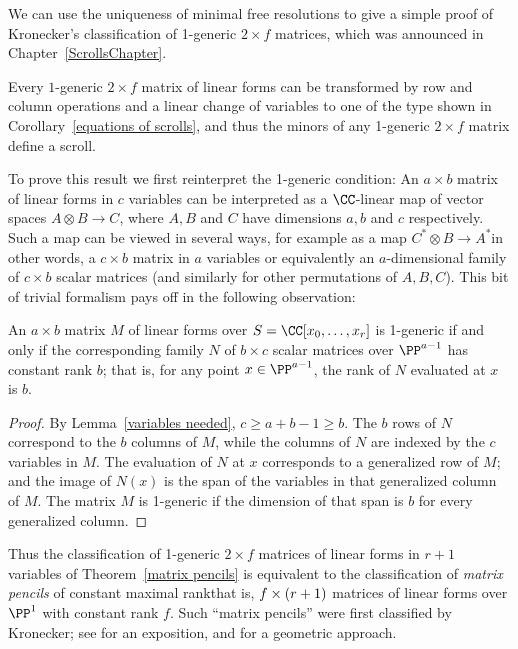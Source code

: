 We can use the uniqueness of minimal free resolutions to give a simple
proof of Kronecker's classification of 1-generic $2\times f$
%
matrices, which was announced in Chapter~\ref{ScrollsChapter}.

\begin{theorem}\label{matrix pencils}
Every
$1$-generic $2 \times f$ matrix of linear forms can be transformed by
row and column operations and a linear change
of variables to one of the type shown in
Corollary~\ref{equations of scrolls}, and thus the minors of any 1-generic
$2 \times f$ matrix define a scroll.
\unif
\end{theorem}

To prove this result we first reinterpret the 1-generic condition:
An
$a\times b$ matrix of linear forms in $c$ variables can be interpreted as a
$\CC$-linear map of vector spaces
$A \otimes B \to C$, where $A, B$ and $C$ have dimensions $a,b$ and $c$
respectively. Such a map
can be viewed in several ways, for example as a map $C^{*} \otimes B\to
A^{*}$\emdash in other words, a $c\times b$ matrix in $a$ variables\emdash
or equivalently an $a$-dimensional family of $c\times b$ scalar matrices (and
similarly for other permutations of $A,B,C$).
This bit of trivial formalism pays off in the following observation:

\begin{proposition}\label{reinterpretation of 1-generic}
An  $a\times b$ matrix $M$ of linear forms  over $S = \CC[x_{0},\dots, x_{r}]$
is 1-generic if and only if
the corresponding family $N$ of $b\times c$ scalar matrices over $\PP^{a-1}$
 has constant rank $b$; that is,
for any point $x \in \PP^{a-1}$, the rank of $N$ evaluated at $x$ is $b$.
\unif
\end{proposition}

\begin{proof}
By Lemma~\ref{variables needed},  $c \geq a+b-1 \geq b$.
 The $b$ rows of $N$ correspond to the $b$ columns of $M$, while the
columns of $N$ are indexed
by the $c$ variables in $M$. The
evaluation of $N$ at $x$ corresponds to a generalized row of $M$;
and the image of $N(x)$
is the span of the variables in that generalized column of $M$. The matrix $M$
is 1-generic if the dimension
of that span is $b$ for every generalized column.
\end{proof}

Thus the classification of 1-generic $2\times f$ matrices of linear
forms in $r+1$ variables of Theorem~\ref{matrix pencils} is equivalent
to the classification
of \emph{matrix pencils} of constant maximal rank\emdash that is, $f \times
\index{matrix pencil}%
(r+1)$ matrices of linear forms over $\PP^{1}$ with constant rank $f$.
Such ``matrix pencils'' were first classified by Kronecker; see
%
\cite[Chapter 12]{Gantmacher} for an exposition, and
\cite{Eisenbud-Harris-Centennial} for a geometric approach.


